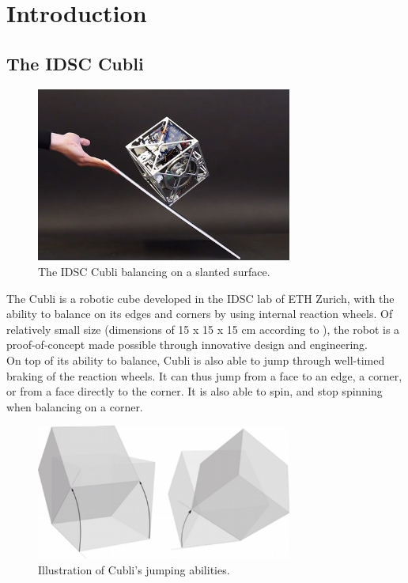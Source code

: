\chapter{Introduction}\label{sec:introduction}

\section{The IDSC Cubli}\label{sec:cubli}

\begin{figure}[ht]
   \centering
   \includegraphics[width=0.75\textwidth]{img/Cubli.jpg}
   \caption{The IDSC Cubli balancing on a slanted surface.}
   \label{img:Cubli}
\end{figure}

The Cubli is a robotic cube developed in the IDSC lab of ETH Zurich, with the ability to balance on its edges and corners by using internal reaction wheels. Of relatively small size (dimensions of 15 x 15 x 15 cm according to \cite{cubliECC13}), the robot is a proof-of-concept made possible through innovative design and engineering.\\

On top of its ability to balance, Cubli is also able to jump through well-timed braking of the reaction wheels. It can thus jump from a face to an edge, a corner, or from a face directly to the corner. It is also able to spin, and stop spinning when balancing on a corner.

\begin{figure}[ht]
   \centering
   \includegraphics[width=0.75\textwidth]{img/Jumps.png}
   \caption{Illustration of Cubli's jumping abilities.}
   \label{img:Jumps}
\end{figure}

